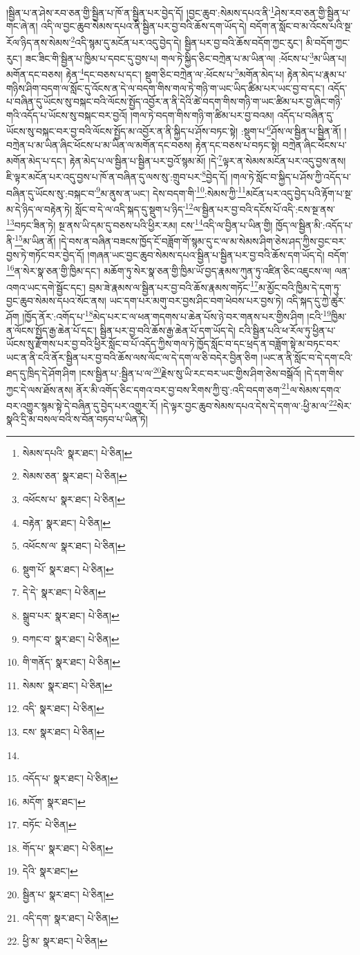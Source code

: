 །སྦྱིན་པ་ན་ཤེས་རབ་ཅན་གྱི་སྦྱིན་པ་ཁོ་ན་སྦྱིན་པར་བྱེད་དོ། །བྱང་ཆུབ་:སེམས་དཔའ་ནི་\footnote{སེམས་དཔའི་  སྣར་ཐང་།  པེ་ཅིན། }ཤེས་རབ་ཅན་གྱི་སྦྱིན་པ་གང་ཞེ་ན། འདི་ལ་བྱང་ཆུབ་སེམས་དཔའ་ནི་སྦྱིན་པར་བྱ་བའི་ཆོས་དག་ཡོད་དེ། བདོག་ན་སློང་བ་མ་འོངས་པའི་སྔ་རོལ་ཉིད་ནས་སེམས་\footnote{སེམས་ཅན་  སྣར་ཐང་།  པེ་ཅིན། }འདི་སྙམ་དུ་མངོན་པར་འདུ་བྱེད་དེ། སྦྱིན་པར་བྱ་བའི་ཆོས་བདོག་ཀྱང་རུང་། མི་བདོག་ཀྱང་རུང་། ཟང་ཟིང་གི་སྦྱིན་པ་ཁྱིམ་པ་དབང་དུ་བྱས་པ། གལ་ཏེ་སྐྱིད་ཅིང་བཀྲེན་པ་མ་ཡིན་ལ། :ཕོངས་པ་\footnote{འཕོངས་པ་  སྣར་ཐང་།  པེ་ཅིན། }མ་ཡིན་པ། མགོན་དང་བཅས། རྟེན་\footnote{བརྟེན་  སྣར་ཐང་།  པེ་ཅིན། }དང་བཅས་པ་དང་། སྡུག་ཅིང་བཀྲེན་ལ་:ཕོངས་པ་\footnote{འཕོངས་ལ་  སྣར་ཐང་།  པེ་ཅིན། }མགོན་མེད་པ། རྟེན་མེད་པ་རྣམ་པ་གཉིས་ཤིག་བདག་ལ་སློང་དུ་འོངས་ན་དེ་ལ་བདག་གིས་གལ་ཏེ་གཉི་ག་ཡང་ཡིད་ཚིམ་པར་ཡང་བྱ་བ་དང་། འདོད་པ་བཞིན་དུ་ཡོངས་སུ་བསྐང་བའི་ལོངས་སྤྱོད་འབྱོར་ན་ནི་དེའི་ཚེ་བདག་གིས་གཉི་ག་ཡང་ཚིམ་པར་བྱ་ཞིང་གཉི་གའི་འདོད་པ་ཡོངས་སུ་བསྐང་བར་བྱའོ། །གལ་ཏེ་བདག་གིས་གཉི་ག་ཚིམ་པར་བྱ་བའམ། འདོད་པ་བཞིན་དུ་ཡོངས་སུ་བསྐང་བར་བྱ་བའི་ལོངས་སྤྱོད་མ་འབྱོར་ན་ནི་སྐྱིད་པ་ཤོས་བཏང་སྟེ། :སྡུག་པ་\footnote{སྡུག་པོ་  སྣར་ཐང་།  པེ་ཅིན། }ཤོས་ལ་སྦྱིན་པ་སྦྱིན་ནོ། །བཀྲེན་པ་མ་ཡིན་ཞིང་ཕོངས་པ་མ་ཡིན་ལ་མགོན་དང་བཅས། རྟེན་དང་བཅས་པ་བཏང་སྟེ། བཀྲེན་ཞིང་ཕོངས་པ་མགོན་མེད་པ་དང་། རྟེན་མེད་པ་ལ་སྦྱིན་པ་སྦྱིན་པར་བྱའོ་སྙམ་མོ། །དེ་\footnote{དེ་དེ་  སྣར་ཐང་།  པེ་ཅིན། }ལྟར་ན་སེམས་མངོན་པར་འདུ་བྱས་ནས། ཇི་ལྟར་མངོན་པར་འདུ་བྱས་པ་ཁོ་ན་བཞིན་དུ་ལས་སུ་:གྲུབ་པར་\footnote{སྒྲུབ་པར་  སྣར་ཐང་།  པེ་ཅིན། }བྱེད་དོ། །གལ་ཏེ་སློང་བ་སྐྱིད་པ་ཤོས་ཀྱི་འདོད་པ་བཞིན་དུ་ཡོངས་སུ་:བསྐང་བ་\footnote{བཀང་བ་  སྣར་ཐང་།  པེ་ཅིན། }མ་ནུས་ན་ཡང་། དེས་བདག་གི་\footnote{གི་གནོད་  སྣར་ཐང་།  པེ་ཅིན། }:སེམས་ཀྱི་\footnote{སེམས་  སྣར་ཐང་།  པེ་ཅིན། }མངོན་པར་འདུ་བྱེད་པའི་རྟོག་པ་སྔ་མ་དེ་ཉིད་ལ་བརྟེན་ཏེ། སློང་བ་དེ་ལ་འདི་སྐད་དུ་སྡུག་པ་ཉིད་\footnote{འདི་  སྣར་ཐང་།  པེ་ཅིན། }ལ་སྦྱིན་པར་བྱ་བའི་དངོས་པོ་འདི་:ངས་སྔ་ནས་\footnote{ངས་  སྣར་ཐང་།  པེ་ཅིན། }བཏང་ཟིན་ཏེ། སྔ་ནས་ཡི་དམ་དུ་བཅས་པའི་ཕྱིར་རམ། ངས་\footnote{}འདི་ལ་བྱིན་པ་ཡིན་གྱི། ཁྱོད་ལ་སྦྱིན་མི་:འདོད་པ་ནི་\footnote{འདོད་པ་  སྣར་ཐང་།  པེ་ཅིན། }མ་ཡིན་ནོ། །དེ་བས་ན་བཞིན་བཟངས་ཁྱོད་ངོ་བཟློག་གོ་སྙམ་དུ་ང་ལ་མ་སེམས་ཤིག་ཅེས་ཤད་ཀྱིས་བྱང་བར་བྱས་ཏེ་གཏོང་བར་བྱེད་དོ། །གཞན་ཡང་བྱང་ཆུབ་སེམས་དཔའ་སྦྱིན་པ་སྦྱིན་པར་བྱ་བའི་ཆོས་དག་ཡོད་དེ། བདོག་\footnote{མདོག་  སྣར་ཐང་། }ན་སེར་སྣ་ཅན་གྱི་ཁྱིམ་དང་། མཆོག་ཏུ་སེར་སྣ་ཅན་གྱི་ཁྱིམ་ཡོ་བྱད་རྣམས་ཀུན་ཏུ་འཛིན་ཅིང་འཇུངས་ལ། ལན་འགའ་ཡང་དགེ་སྦྱོང་དང་། བྲམ་ཟེ་རྣམས་ལ་སྦྱིན་པར་བྱ་བའི་ཆོས་རྣམས་གཏོང་\footnote{བཏོང་  པེ་ཅིན། }མ་མྱོང་བའི་ཁྱིམ་དེ་དག་ཏུ་བྱང་ཆུབ་སེམས་དཔའ་སོང་ནས། ཡང་དག་པར་མགུ་བར་བྱས་ཤིང་བག་ཕེབས་པར་བྱས་ཏེ། འདི་སྐད་དུ་ཀྱེ་ཚུར་ཤོག །ཁྱོད་ནོར་:འགོད་པ་\footnote{གོད་པ་  སྣར་ཐང་།  པེ་ཅིན། }མེད་པར་ང་ལ་ཕན་གདགས་པ་ཆེན་པོས་ཉེ་བར་གནས་པར་གྱིས་ཤིག །ངའི་\footnote{དེའི་  སྣར་ཐང་། }ཁྱིམ་ན་ལོངས་སྤྱོད་རྒྱ་ཆེན་པོ་དང་། སྦྱིན་པར་བྱ་བའི་ཆོས་རྒྱ་ཆེན་པོ་དག་ཡོད་དེ། ངའི་སྦྱིན་པའི་ཕ་རོལ་ཏུ་ཕྱིན་པ་ཡོངས་སུ་རྫོགས་པར་བྱ་བའི་ཕྱིར་སློང་བ་པོ་འདོད་ཀྱིས་གལ་ཏེ་ཁྱོད་སློང་བ་དང་ཕྲད་ན་བཟློག་སྟེ་མ་བཏང་བར་ཡང་ན་ནི་ངའི་ནོར་སྦྱིན་པར་བྱ་བའི་ཆོས་ལས་ལོང་ལ་དེ་དག་ལ་ཅི་བདེར་བྱིན་ཅིག །ཡང་ན་ནི་སློང་བ་དེ་དག་ངའི་ཐད་དུ་ཁྲིད་དེ་ཤོག་ཤིག །ངས་སྦྱིན་པ་:སྦྱིན་པ་ལ་\footnote{སྦྱིན་པ་  སྣར་ཐང་།  པེ་ཅིན། }རྗེས་སུ་ཡི་རང་བར་ཡང་གྱིས་ཤིག་ཅེས་བསྒོའོ། །དེ་དག་གིས་ཀྱང་དེ་ལས་ཐོས་ནས། ནོར་མི་འགོད་ཅིང་དགའ་བར་བྱ་བས་རིགས་ཀྱི་བུ་:འདི་བདག་ཅག་\footnote{འདི་དག་  སྣར་ཐང་།  པེ་ཅིན། }ལ་སེམས་དགའ་བར་འགྱུར་སྙམ་སྟེ་དེ་བཞིན་དུ་བྱེད་པར་འགྱུར་རོ། །དེ་ལྟར་བྱང་ཆུབ་སེམས་དཔའ་དེས་དེ་དག་ལ་:ཕྱི་མ་ལ་\footnote{ཕྱི་མ་  སྣར་ཐང་།  པེ་ཅིན། }སེར་སྣའི་དྲི་མ་བསལ་བའི་ས་བོན་བཏབ་པ་ཡིན་ཏེ། 
